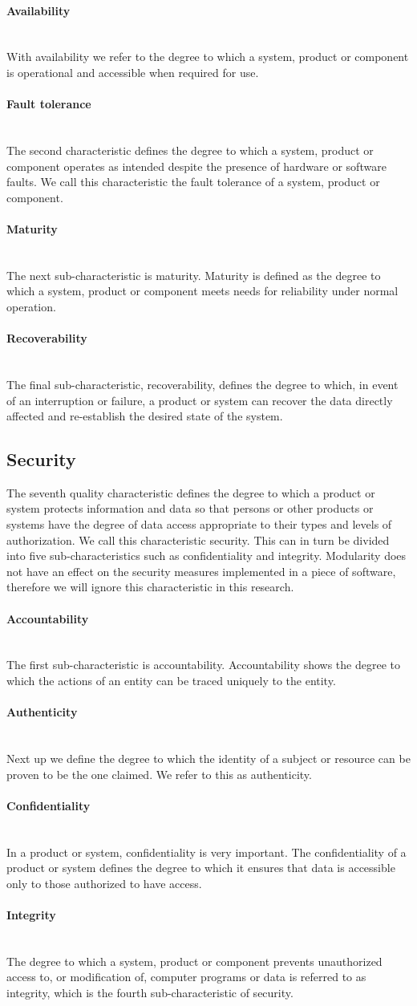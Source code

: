 \documentclass[twoside]{uva-inf-bachelor-thesis}
\newcommand{\myparagraph}[1]{\paragraph{#1}\mbox{}\\}
\begin{document}
\myparagraph{Availability}
With availability we refer to the degree to which a system, product or component is operational and accessible when required for use.

\myparagraph{Fault tolerance}
The second characteristic defines the degree to which a system, product or component operates as intended despite the presence of hardware or software faults. We call this characteristic the fault tolerance of a system, product or component.

\myparagraph{Maturity}
The next sub-characteristic is maturity. Maturity is defined as the degree to which a system, product or component meets needs for reliability under normal operation.

\myparagraph{Recoverability}
The final sub-characteristic, recoverability, defines the degree to which, in event of an interruption or failure, a product or system can recover the data directly affected and re-establish the desired state of the system.

\subsection{Security}
The seventh quality characteristic defines the degree to which a product or system protects information and data so that persons or other products or systems have the degree of data access appropriate to their types and levels of authorization. We call this characteristic security. This can in turn be divided into five sub-characteristics such as confidentiality and integrity. Modularity does not have an effect on the security measures implemented in a piece of software, therefore we will ignore this characteristic in this research.

\myparagraph{Accountability}
The first sub-characteristic is accountability. Accountability shows the degree to which the actions of an entity can be traced uniquely to the entity.

\myparagraph{Authenticity}
Next up we define the degree to which the identity of a subject or resource can be proven to be the one claimed. We refer to this as authenticity.

\myparagraph{Confidentiality}
In a product or system, confidentiality is very important. The confidentiality of a product or system defines the degree to which it ensures that data is accessible only to those authorized to have access.

\myparagraph{Integrity}
The degree to which a system, product or component prevents unauthorized access to, or modification of, computer programs or data is referred to as integrity, which is the fourth sub-characteristic of security.
\end{document}
